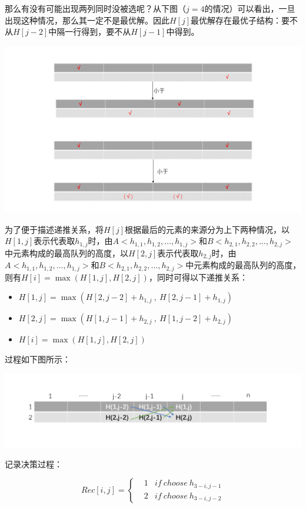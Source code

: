 \documentclass{ctexart}
\begin{document}
那么有没有可能出现两列同时没被选呢？从下图（$j=4$的情况）可以看出，一旦出现这种情况，那么其一定不是最优解。因此$H[j]$最优解存在最优子结构：要不从$H[j-2]$中隔一行得到，要不从$H[j-1]$中得到。

\includegraphics[width=1.0\textwidth]{幻灯片2.PNG}

为了便于描述递推关系，将$H[j]$根据最后的元素的来源分为上下两种情况，以$H[1,j]$表示代表取$h_{1,j}$时，由$A<h_{1,1},h_{1,2},\ldots,h_{1,j}>$和$B<h_{2,1},h_{2,2},\ldots,h_{2,j}>$中元素构成的最高队列的高度，以$H[2,j]$表示代表取$h_{2,j}$时，由$A<h_{1,1},h_{1,2},\ldots,h_{1,j}>$和$B<h_{2,1},h_{2,2},\ldots,h_{2,j}>$中元素构成的最高队列的高度，则有$H[i]=\max(H[1,j],H[2,j])$，同时可得以下递推关系：
\begin{itemize}
    \item $H[1,j]=\max(H[2,j-2]+h_{1,j}\ ,\ H[2,j-1]+h_{1,j})$
    \item $H[2,j]=\max(H[1,j-1]+h_{2,j}\ ,\ H[1,j-2]+h_{2,j})$
    \item $H[i]=\max(H[1,j],H[2,j])$
\end{itemize}

过程如下图所示：

\includegraphics[width=1.0\textwidth]{final.PNG}

记录决策过程：

$$Rec[i,j]=\left\{
\begin{aligned}
& 1   & if \ choose \ h_{3-i,j-1}\\
& 2   & if \ choose \ h_{3-i,j-2} 
\end{aligned}
\right.
$$
\end{document}
